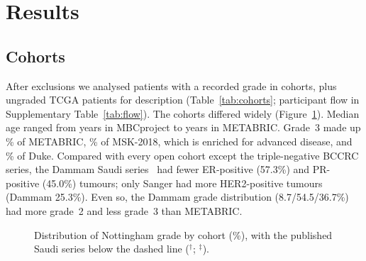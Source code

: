 \section{Results}\label{sec:results}

\subsection{Cohorts}
After exclusions we analysed \NGradedTotal{} patients with a recorded grade in \NGradedCohorts{}
cohorts, plus \NTcga{} ungraded TCGA patients for description (Table~\ref{tab:cohorts};
participant flow in Supplementary Table~\ref{tab:flow}). The cohorts differed widely
(Figure~\ref{fig:grade}). Median age ranged from \AgeMbc{} years in MBCproject to \AgeMetabric{} years
in METABRIC. Grade~3 made up \GThreeMetabric\% of METABRIC, \GThreeMsk\% of MSK-2018, which is
enriched for advanced disease, and \GThreeDuke\% of Duke. Compared with every open cohort except the
triple-negative BCCRC series, the Dammam Saudi series~\citep{kussaibi2021saudi} had fewer ER-positive
(57.3\%) and PR-positive (45.0\%) tumours; only Sanger had more HER2-positive tumours (Dammam
25.3\%). Even so, the Dammam grade distribution (8.7/54.5/36.7\%) had more grade~2 and less grade~3
than METABRIC.

\begin{table}[htbp]\centering\small
\caption{Characteristics of the open cohorts after harmonisation and of two published Saudi hospital
series. Percentages are of patients with the variable recorded (missingness in
\texttt{results/e1\_cohorts.csv}). MSK = MSK-2018; MBCP = MBCproject; Broad = Mexico and Vietnam;
dev/ext/desc = development, external validation, descriptive. $^\dagger$Saudi nationals, King Fahd
University Hospital, Dammam, 1998--2017~\citep{kussaibi2021saudi}. $^\ddagger$King Fahad Medical
City, Riyadh, 2016--2019 (90.1\% Saudi nationals; 39.8\% stage IV)~\citep{durrani2025healthcare};
receptor percentages recomputed from the published counts.}\label{tab:cohorts}
\tabfit{}
\end{table}

\begin{figure}[htbp]\centering
{}
\caption{Distribution of Nottingham grade by cohort (\%), with the published Saudi series below the
dashed line ($^\dagger$\citealp{kussaibi2021saudi}; $^\ddagger$\citealp{durrani2025healthcare}).}\label{fig:grade}
\end{figure}

